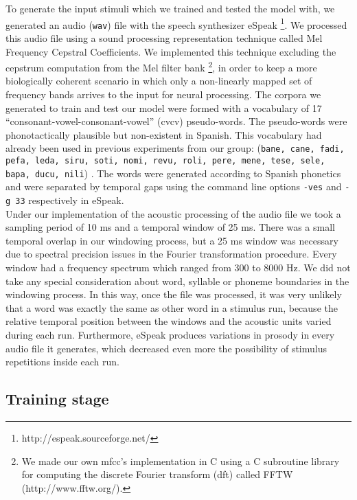 \documentclass[11pt,a4paper]{article}
\begin{document}
To generate the input stimuli which we trained and tested the model with,
we generated an audio  (\texttt{wav}) file with the speech synthesizer eSpeak
\footnote{http://espeak.sourceforge.net/}.
We processed this audio file using a sound processing representation technique
called Mel Frequency Cepstral Coefficients.
We implemented this technique excluding the cepstrum computation from the
Mel filter bank \footnote{We made our own \ac{mfcc}'s implementation
in C using a C subroutine library for computing the discrete Fourier transform
(\ac{dft}) called FFTW (http://www.fftw.org/).},
in order to keep a more biologically coherent scenario in which
only a non-linearly mapped set of frequency bands arrives to the input
for neural processing.
The corpora we generated to train and test our model were formed with
a vocabulary of 17 “consonant-vowel-consonant-vowel” (\ac{cvcv}) pseudo-words.
The pseudo-words were phonotactically plausible but non-existent in Spanish.
This vocabulary had already been used in previous experiments from our group:
(\texttt{bane, cane, fadi, pefa, leda, siru, soti, nomi, revu,
roli, pere, mene, tese, sele, bapa, ducu, nili}) \cite{tabullo13}.
The words were generated according to Spanish phonetics and were separated
by temporal gaps using the command line options \texttt{-ves} and
\texttt{-g 33} respectively in eSpeak.\\

Under our implementation of the acoustic processing of the audio file
we took a sampling period of 10 ms and a temporal window of
25 ms.
There was a small temporal overlap in our windowing process, but a 25 ms
window was necessary due to spectral precision issues in the Fourier
transformation procedure.
Every window had a frequency spectrum which ranged from $300$ to $8000$ Hz.
We did not take any special consideration about word, syllable or phoneme
boundaries in the windowing process.
In this way, once the file was processed, it was very unlikely that a word
was exactly the same as other word in a stimulus run, because the relative temporal
position between the windows and the acoustic units varied during each run.
Furthermore, eSpeak produces variations in prosody in every audio file it generates,
which decreased even more the possibility of stimulus repetitions inside each run.\\

\subsection{Training stage} \label{training}
\end{document}
